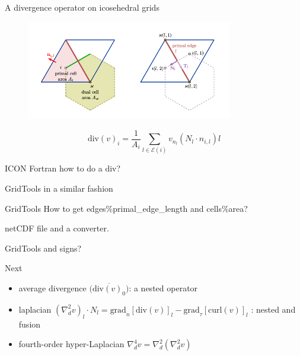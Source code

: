 \documentclass{beamer}
\begin{document}
\begin{frame}{A divergence operator on icosehedral grids}
  \begin{figure}[htbp]
  \centering
  \includegraphics[width=0.8\textwidth]{1.png}
  \end{figure}
  \[\text{div}(v)_i = \frac{1}{A_i}\sum\limits_{l\in \mathcal{E}(i)}v_{n_l}(N_l \cdot n_{i,l})l\]
\end{frame}

\begin{frame}[fragile]{ICON Fortran}
  how to do a div?
\end{frame}

\begin{frame}{GridTools}
  in a similar fashion
\end{frame}

\begin{frame}{GridTools}
How to get edges\%primal\_edge\_length and cells\%area?

\hspace{5em}

netCDF file and a converter.
\end{frame}

\begin{frame}{GridTools}
  and signs?
\end{frame}

\begin{frame}{Next}
  \begin{itemize}
    \item average divergence $\overline{\Big(\text{div}(v)_0\Big)}$: a nested operator
    \item laplacian $(\nabla^2_dv)_l\cdot N_l=\text{grad}_n[\text{div}(v)]_l-\text{grad}_\tau[\text{curl}(v)]_l$
    : nested and fusion
    \item fourth-order hyper-Laplacian $\nabla^4_dv=\nabla^2_d(\nabla^2_dv)$
  \end{itemize}
\end{frame}
\end{document}
